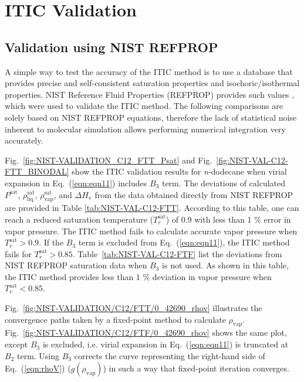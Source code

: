 \documentclass[5p,times]{elsarticle}
\begin{document}
\section{ITIC Validation}
\subsection{Validation using NIST REFPROP} \label{sec:NIST-VAL}
A simple way to test the accuracy of the ITIC method is to use a database that provides precise and self-consistent saturation properties and isochoric/isothermal properties. NIST Reference Fluid Properties (REFPROP) provides such values \cite{LEMMON-RP91,Bucker2006,Lemmon2004,Wagner2002}, which were used to validate the ITIC method. The following comparisons are solely based on NIST REFPROP equations, therefore the lack of statistical noise inherent to molecular simulation allows performing numerical integration very accurately. 

Fig.~\ref{fig:NIST-VALIDATION_C12_FTT_Psat} and Fig.~\ref{fig:NIST-VAL-C12-FTT_BINODAL} show the ITIC validation results for \textit{n}-dodecane when virial expansion in Eq.~(\ref{eqn:eqn11}) includes $B_{3}$ term. The deviations of calculated $P^{\mathrm{sat}}$, $\rho_{\mathrm{liq}}^{\mathrm{sat}}$, $\rho_{\mathrm{vap}}^{\mathrm{sat}}$, and $\Delta H_{\mathrm{v}}$ from the data obtained directly from NIST REFPROP \cite{Lemmon2004} are provided in Table \ref{tab:NIST-VAL-C12-FTT}. According to this table, one can reach a reduced saturation temperature ($T_r^{\mathrm{sat}}$) of 0.9 with less than 1 \% error in vapor pressure. The ITIC method fails to calculate accurate vapor pressure when $T_r^{\mathrm{sat}}>0.9$. If the $B_3$ term is excluded from Eq.~(\ref{eqn:eqn11}), the ITIC method fails for $T_r^{\mathrm{sat}} > 0.85$. Table~\ref{tab:NIST-VAL-C12-FTF} list the deviations from NIST REFPROP saturation data when $B_3$ is not used. As shown in this table, the ITIC method provides less than 1 \% deviation in vapor pressure when $T_r^{\mathrm{sat}} < 0.85$.

Fig.~\ref{fig:NIST-VALIDATION/C12/FTT/0_42690_rhov} illustrates the convergence paths taken by a fixed-point method to calculate $\rho_{\mathrm{vap}}$. Fig.~\ref{fig:NIST-VALIDATION/C12/FTF/0_42690_rhov} shows the same plot, except $B_3$ is excluded, i.e. virial expansion in Eq.~(\ref{eqn:eqn11}) is truncated at $B_{2}$ term. Using $B_3$ corrects the curve representing the right-hand side of Eq.~(\ref{eqn:rhoV}) ($g(\rho_{\mathrm{vap}})$) in such a way that fixed-point iteration converges. 
\end{document}
